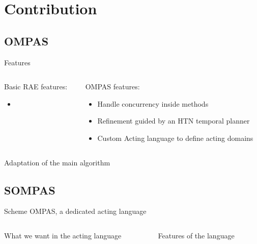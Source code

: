 \section{Contribution}
\subsection{OMPAS}
\begin{frame}{Features}
    \begin{columns}
        \begin{column}{0.5\textwidth}
            Basic RAE features:
            \begin{itemize}
                \item 
            \end{itemize}
        \end{column}
        \begin{column}{0.5\textwidth}
            OMPAS features:
            \begin{itemize}
                \pause
                \item Handle concurrency inside methods
                \pause
                \item Refinement guided by an HTN temporal planner
                \pause
                \item Custom Acting language to define acting domains
            \end{itemize}
        \end{column}
    \end{columns}
\end{frame}

\begin{frame}{Adaptation of the main algorithm}
    
\end{frame}

\subsection{SOMPAS}
\begin{frame}{Scheme OMPAS, a dedicated acting language}
    \begin{columns}
        \begin{column}{0.5\textwidth}
            What we want in the acting language
        \end{column}
        \begin{column}{0.5\textwidth}
            Features of the language
        \end{column}
    \end{columns}
\end{frame}

